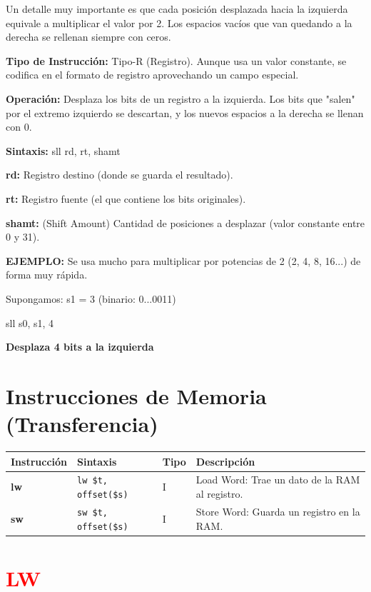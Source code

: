 \documentclass[12pt,a4paper]{article}
\begin{document}
Un detalle muy importante es que cada posición desplazada hacia la izquierda equivale a multiplicar el valor por 2. Los espacios vacíos que van quedando a la derecha se rellenan siempre con ceros.

\textbf{Tipo de Instrucción:} Tipo-R (Registro). 
Aunque usa un valor constante, se codifica en el formato de registro aprovechando un campo especial.

\textbf{Operación:} Desplaza los bits de un registro a la izquierda. Los bits que "salen" por el extremo izquierdo se descartan, y los nuevos espacios a la derecha se llenan con 0.

\textbf{Sintaxis:} sll rd, rt, shamt

\textbf{rd:} Registro destino (donde se guarda el resultado).

\textbf{rt:} Registro fuente (el que contiene los bits originales).

\textbf{shamt:} (Shift Amount) Cantidad de posiciones a desplazar (valor constante entre 0 y 31).

\textbf{EJEMPLO:}
Se usa mucho para multiplicar por potencias de 2 (2, 4, 8, 16...) de forma muy rápida.

Supongamos: s1 = 3 (binario: 0...0011)

sll s0, s1, 4

\textbf{Desplaza 4 bits a la izquierda}

\vspace{0.4cm}

\section*{\textcolor{mipsblue}{Instrucciones de Memoria (Transferencia)}}
\begin{tabular}{|l|l|l|l|}
\hline
\textbf{Instrucción} & \textbf{Sintaxis} & \textbf{Tipo} & \textbf{Descripción} \\ \hline
\textbf{lw} & \texttt{lw \$t, offset(\$s)} & I & Load Word: Trae un dato de la RAM al registro. \\ \hline
\textbf{sw} & \texttt{sw \$t, offset(\$s)} & I & Store Word: Guarda un registro en la RAM. \\ \hline
\end{tabular}

\section{\textcolor{red}{LW}}
\end{document}
